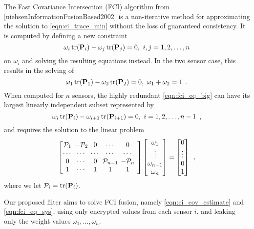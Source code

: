 The Fast Covariance Intersection (FCI) algorithm from [niehsenInformationFusionBased2002] is a non-iterative method for approximating the solution to \eqref{eqn:ci_trace_min} without the loss of guaranteed consistency. It is computed by defining a new constraint
\begin{equation}
   \omega_i \operatorname{tr}({{\mathbf{P}}}_i) - \omega_j \operatorname{tr}({{\mathbf{P}}}_j) = 0,\ i,j=1,2,\dots,n \label{eqn:fci_eq_big}
\end{equation}
on $\omega_i$ and solving the resulting equations instead. In the two sensor case, this results in the solving of
\begin{equation}
   \omega_1 \operatorname{tr}({{\mathbf{P}}}_1) - \omega_2 \operatorname{tr}({{\mathbf{P}}}_2) = 0,\ \omega_1 + \omega_2 = 1\enspace. \label{eqn:fci_2sen_omega_sum_eq}
\end{equation}
When computed for $n$ sensors, the highly redundant \eqref{eqn:fci_eq_big} can have its largest linearly independent subset represented by
\begin{equation}
   \omega_i \operatorname{tr}({{\mathbf{P}}}_i) - \omega_{i+1} \operatorname{tr}({{\mathbf{P}}}_{i+1}) = 0,\ i=1,2,\dots,n-1\enspace, \label{eqn:fci_eq}
\end{equation}
and requires the solution to the linear problem
\begin{equation}
   \begingroup
   \setlength\arraycolsep{2pt}
   \begin{bmatrix}
      \mathcal{P}_1 & -\mathcal{P}_2 & 0 & \cdots & 0 \\
      \cdots & \cdots & \cdots & \cdots & \cdots & \\
      0 & \cdots & 0 & \mathcal{P}_{n-1} & -\mathcal{P}_{n} \\
      1 & \cdots & 1 & 1 & 1 &
   \end{bmatrix}
   \begin{bmatrix}
      \omega_1 \\
      \vdots \\
      \omega_{n-1} \\
      \omega_{n}
   \end{bmatrix}
   =
   \begin{bmatrix}
      0 \\
      \vdots \\
      0 \\
      1
   \end{bmatrix}\enspace, \label{eqn:fci_eq_sys}
   \endgroup
\end{equation}
where we let $\mathcal{P}_i = \operatorname{tr}({{\mathbf{P}}}_i)$.

Our proposed filter aims to solve FCI fusion, namely \eqref{eqn:ci_cov_estimate} and \eqref{eqn:fci_eq_sys}, using only encrypted values from each sensor $i$, and leaking only the weight values $\omega_1,\dots,\omega_n$.

